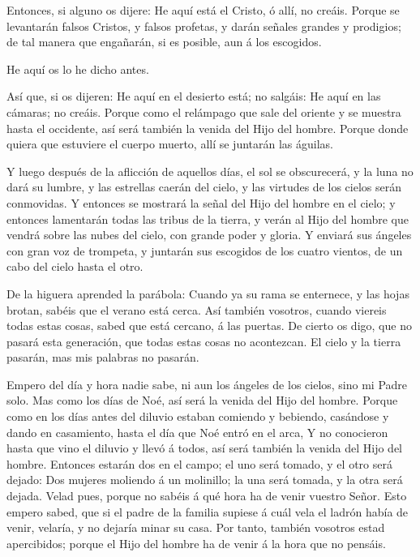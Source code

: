  Entonces, si alguno os dijere: He aquí está el Cristo, ó
allí, no creáis.  Porque se levantarán falsos Cristos, y
falsos profetas, y darán señales grandes y prodigios; de tal manera que
engañarán, si es posible, aun á los escogidos.

 He aquí os lo he dicho antes.

 Así que, si os dijeren: He aquí en el desierto está; no
salgáis: He aquí en las cámaras; no creáis.  Porque como el
relámpago que sale del oriente y se muestra hasta el occidente, así será
también la venida del Hijo del hombre.  Porque donde quiera
que estuviere el cuerpo muerto, allí se juntarán las águilas.

 Y luego después de la aflicción de aquellos días, el sol
se obscurecerá, y la luna no dará su lumbre, y las estrellas caerán del
cielo, y las virtudes de los cielos serán conmovidas.  Y
entonces se mostrará la señal del Hijo del hombre en el cielo; y
entonces lamentarán todas las tribus de la tierra, y verán al Hijo del
hombre que vendrá sobre las nubes del cielo, con grande poder y gloria.
 Y enviará sus ángeles con gran voz de trompeta, y juntarán
sus escogidos de los cuatro vientos, de un cabo del cielo hasta el otro.

 De la higuera aprended la parábola: Cuando ya su rama se
enternece, y las hojas brotan, sabéis que el verano está cerca.
 Así también vosotros, cuando viereis todas estas cosas,
sabed que está cercano, á las puertas.  De cierto os digo,
que no pasará esta generación, que todas estas cosas no acontezcan.
 El cielo y la tierra pasarán, mas mis palabras no pasarán.

 Empero del día y hora nadie sabe, ni aun los ángeles de
los cielos, sino mi Padre solo.  Mas como los días de Noé,
así será la venida del Hijo del hombre.  Porque como en los
días antes del diluvio estaban comiendo y bebiendo, casándose y dando en
casamiento, hasta el día que Noé entró en el arca,  Y no
conocieron hasta que vino el diluvio y llevó á todos, así será también
la venida del Hijo del hombre.  Entonces estarán dos en el
campo; el uno será tomado, y el otro será dejado:  Dos
mujeres moliendo á un molinillo; la una será tomada, y la otra será
dejada.  Velad pues, porque no sabéis á qué hora ha de
venir vuestro Señor.  Esto empero sabed, que si el padre de
la familia supiese á cuál vela el ladrón había de venir, velaría, y no
dejaría minar su casa.  Por tanto, también vosotros estad
apercibidos; porque el Hijo del hombre ha de venir á la hora que no
pensáis.

